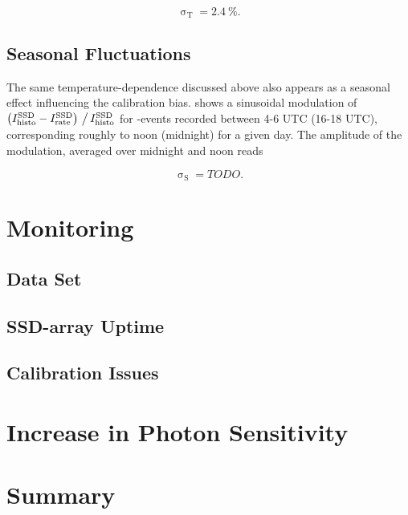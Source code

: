 \begin{equation}
	\label{eq:ssd-temperature-fluctuation}
	\upsigma_\mathrm{T} = \SI{2.4}{\percent}.
\end{equation}

\subsection{Seasonal Fluctuations}

The same temperature-dependence discussed above also appears as a seasonal 
effect influencing the calibration bias.  
shows a sinusoidal modulation of 
$\left(I^\text{SSD}_\text{histo} - I^\text{SSD}_\text{rate}\right)\,\big/\,I^\text{SSD}_\text{histo}$ for \TTHREE-events
recorded between 4-6 UTC (16-18 UTC), corresponding roughly to noon (midnight) 
for a given day. The amplitude of the modulation, averaged over midnight and 
noon reads

\begin{equation}
	\label{eq:ssd-seasonal-fluctuation}
	\upsigma_\mathrm{S} = TODO.
\end{equation}

\section{Monitoring}
\label{sec:ssd-online-calibration-monitoring}



\subsection{Data Set}
\subsection{SSD-array Uptime}
\subsection{Calibration Issues}
\label{ssec:calibration-issues}

\section{Increase in Photon Sensitivity}
\section{Summary}

